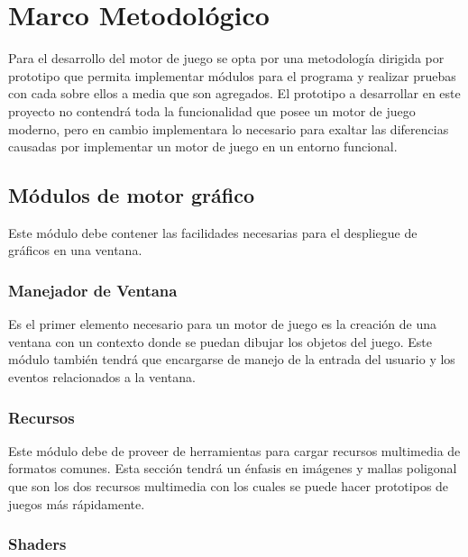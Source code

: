 
\chapter{Marco Metodológico}  %

\ifpdf
    \graphicspath{{metodologia/Figs/Raster/}{metodologia/Figs/PDF/}{metodologia/Figs/}}
\else
    \graphicspath{{metodologia/Figs/Vector/}{metodologia/Figs/}}
\fi

Para el desarrollo del motor de juego se opta por una metodología dirigida por prototipo que permita implementar módulos para el programa y realizar pruebas con cada sobre ellos a media que son agregados. El prototipo a desarrollar en este proyecto no contendrá toda la funcionalidad que posee un motor de juego moderno, pero en cambio implementara lo necesario para exaltar las diferencias causadas por implementar un motor de juego en un entorno funcional.

\section{Módulos de motor gráfico}

Este módulo debe contener las facilidades necesarias para el despliegue de gráficos en una ventana.

\subsection{Manejador de Ventana}

Es el primer elemento necesario para un motor de juego es la creación de una ventana con un contexto donde se puedan dibujar los objetos del juego. Este módulo también tendrá que encargarse de manejo de la entrada del usuario y los eventos relacionados a la ventana.

\subsection{Recursos}

Este módulo debe de proveer de herramientas para cargar recursos multimedia de formatos comunes. Esta sección tendrá un énfasis en imágenes y mallas poligonal que son los dos recursos multimedia con los cuales se puede hacer prototipos de juegos más rápidamente.

\subsection{Shaders}

